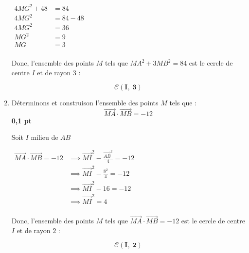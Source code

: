 \documentclass[12pt,a4paper]{article}
\begin{document}
\begin{enumerate}
		    \(
    \begin{aligned}
    		4MG^2+48 &= 84\\
        4MG^2 &= 84-48\\  
         4MG^2 &=36\\
         MG^2 &=9\\
         MG &=3\\
    \end{aligned}
    \)    
    
    Donc, l'ensemble des points \( M \) tels que \( MA^2 + 3MB^2 = 84 \) est le cercle de centre \( I \) et de rayon \( 3 \) :   
    		    \begin{resultbox}
            \[
                \mathbf{\mathscr{C}(I,\;3) }
            \]
					\end{resultbox} 
    
    \item Déterminons et construison l'ensemble des points \( M \) tels que :
    \[
    \overrightarrow{MA}\cdot\overrightarrow{MB} = -12
    \]
    \hfill \textbf{0{,}1 pt}

		Soit \(I\) milieu de \(AB\)  
		
		\(		
		\begin{aligned}
			\overrightarrow{MA} \cdot \overrightarrow{MB} = -12 &\implies \overrightarrow{MI}^{2}-\frac{\overrightarrow{AB}^{2}}{4} = -12\\
			&\implies \overrightarrow{MI}^{2}-\frac{8^{2}}{4} = -12\\
			&\implies \overrightarrow{MI}^{2}-16 = -12\\
			&\implies \overrightarrow{MI}^{2} = 4\\
		\end{aligned}
		\)  

Donc, l'ensemble des points \( M \) tels que \( \overrightarrow{MA} \cdot \overrightarrow{MB} = -12 \) est le cercle de centre \( I \) et de rayon \( 2 \) :   
    		    \begin{resultbox}
            \[
                \mathbf{\mathscr{C}(I,\;2) }
            \]
					\end{resultbox}  
\end{enumerate}
\end{document}
